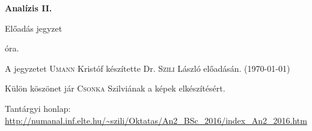 \documentclass[a4paper,11.5pt]{article}
\begin{document}
	\setlength\parindent{0pt}
	\def\s{\hspace{0.2mm}\vphantom{\beta}}
	\def\Z{\mathbb{Z}}
	\def\Q{\mathbb{Q}}
	\def\R{\mathbb{R}}
	\def\C{\mathbb{C}}
	\def\N{\mathbb{N}}
	\def\Ra{\overline{\mathbb{R}}}
	
	\def\sume{\displaystyle\sum_{n=1}^{+\infty}}
	\def\sumn{\displaystyle\sum_{n=0}^{+\infty}}
	
	\def\narrow{\underset{n\rightarrow+\infty}{\longrightarrow}}
	\def\limn{\displaystyle\lim_{n\to +\infty}}
	\def\limx{\displaystyle\lim_{x\to +\infty}}
	
	\theoremstyle{definition}
	\newtheorem{theorem}{Tétel}[subsection] 
	
	\theoremstyle{definition}
	\newtheorem{definition}[theorem]{Definíció} 
	\newtheorem{example}[theorem]{Példa} 
	\newtheorem{task}[theorem]{Feladat} 
	\newtheorem{note}[theorem]{Megjegyzés}
	\newtheorem{revision}[theorem]{Emlékeztető}
	\begin{center}
		{\LARGE\textbf{Analízis II.}}
		
		{\Large Előadás jegyzet}
		
		óra.
	\end{center}
	A jegyzetet \textsc{Umann} Kristóf készítette Dr. \textsc{Szili} László  előadásán. (\today)
	
	Külön köszönet jár \textsc{Csonka} Szilviának a képek elkészítésért.
	\bigskip
	
	Tantárgyi honlap: \url{http://numanal.inf.elte.hu/~szili/Oktatas/An2_BSc_2016/index_An2_2016.htm}
	
\end{document}
